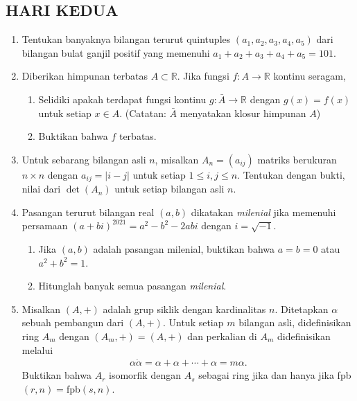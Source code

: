 \documentclass[12pt,twoside]{article}
\begin{document}
\subsection{HARI KEDUA}
\begin{enumerate}
    \item Tentukan banyaknya bilangan terurut quintuples $(a_1,a_2,a_3,a_4,a_5)$ dari bilangan bulat ganjil positif yang memenuhi $a_1+a_2+a_3+a_4+a_5=101$.
    \item Diberikan himpunan terbatas $A\subset \mathbb{R}$. Jika fungsi $f:A\rightarrow\mathbb{R}$ kontinu seragam,
          \begin{enumerate}
              \item Selidiki apakah terdapat fungsi kontinu $g:\bar{A}\rightarrow\mathbb{R}$ dengan $g(x)=f(x)$ untuk setiap $x\in A$. (Catatan: $\bar{A}$ menyatakan klosur himpunan $A$)
              \item Buktikan bahwa $f$ terbatas.
          \end{enumerate}
    \item Untuk sebarang bilangan asli $n$, misalkan $A_n=(a_{ij})$ matriks berukuran $n\times n$ dengan $a_{ij}=|i-j|$ untuk setiap $1\leq i,j\leq n$. Tentukan dengan bukti, nilai dari $\det(A_n)$ untuk setiap bilangan asli $n$.
    \item Pasangan terurut bilangan real $(a,b)$ dikatakan \textit{milenial} jika memenuhi persamaan $(a+bi)^{2021}=a^2-b^2-2abi$ dengan $i=\sqrt{-1}$.
          \begin{enumerate}
              \item Jika $(a,b)$ adalah pasangan milenial, buktikan bahwa $a=b=0$ atau $a^2+b^2=1$.
              \item Hitunglah banyak semua pasangan \textit{milenial}.
          \end{enumerate}
    \item Misalkan $(A,+)$ adalah grup siklik dengan kardinalitas $n$. Ditetapkan $\alpha$ sebuah pembangun dari $(A,+)$. Untuk setiap $m$ bilangan asli, didefinisikan ring $A_m$ dengan $(A_m,+)=(A,+)$ dan perkalian di $A_m$ didefinisikan melalui
          \begin{align*}
              \alpha\dot \alpha = \alpha+\alpha+\cdots +\alpha =m\alpha.
          \end{align*}
          Buktikan bahwa $A_r$ isomorfik dengan $A_s$ sebagai ring jika dan hanya jika fpb$(r,n)=$fpb$(s,n)$.
\end{enumerate}

\pagebreak
\end{document}
